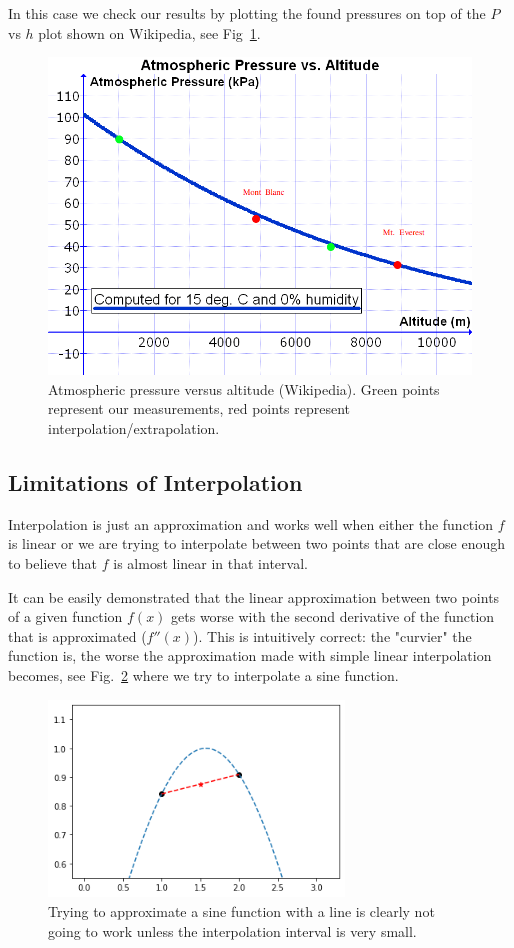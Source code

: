 In this case we check our results by plotting the found pressures on top of the $P$ vs $h$ plot shown on Wikipedia, see Fig~\ref{fig:Pvsh}.

\begin{figure}
\centering
\includegraphics[width=0.7\linewidth]{figures/Atmospheric_Pressure_vs._Altitude.png}
\caption{Atmospheric pressure versus altitude (Wikipedia). Green points represent our measurements, red points represent interpolation/extrapolation.}
\label{fig:Pvsh}
\end{figure}

\subsection{Limitations of Interpolation}
Interpolation is just an approximation and works well when either the function $f$ is linear or we are trying to interpolate between two points that are close enough to believe that $f$ is almost linear in that interval.

It can be easily demonstrated that the linear approximation between two points of a given function $f(x)$ gets worse with the second derivative of the function that is approximated ($f''(x)$). This is intuitively correct: the "curvier" the function is, the worse the approximation made with simple linear interpolation becomes, see Fig.~\ref{fig:sine_interp} where we try to interpolate a sine function.

\begin{figure}
  \centering
  \includegraphics[width=0.7\textwidth]{figures/wrong_interp.png}
  \caption{Trying to approximate a sine function with a line is clearly not going to work unless the interpolation interval is very small.}
  \label{fig:sine_interp}
\end{figure}

